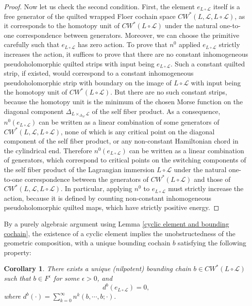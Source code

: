 \documentclass{amsart}
\newtheorem{corollary}[theorem]{Corollary}
\numberwithin{equation}{section}
\numberwithin{figure}{section}
\begin{document}
\begin{proof}
	Now let us check the second condition. First, the element $e_{L \circ \mathcal{L}}$ itself is a free generator of the quilted wrapped Floer cochain space $CW^{*}(L, \mathcal{L}, L \circ \mathcal{L})$, as it corresponds to the homotopy unit of $CW^{*}(L \circ \mathcal{L})$ under the natural one-to-one correspondence between generators. Moreover, we can choose the primitive carefully such that $e_{L \circ \mathcal{L}}$ has zero action. To prove that $n^{0}$ applied $e_{L \circ \mathcal{L}}$ strictly increases the action, it suffices to prove that there are no constant inhomogeneous pseudoholomorphic quilted strips with input being $e_{L \circ \mathcal{L}}$. Such a constant quilted strip, if existed, would correspond to a constant inhomogeneous pseudoholomorphic strip with boundary on the image of $L \circ \mathcal{L}$ with input being the homotopy unit of $CW^{*}(L \circ \mathcal{L})$. But there are no such constant strips, because the homotopy unit is the minimum of the chosen Morse function on the diagonal component $\Delta_{L \times_{\Delta_{M}} \mathcal{L}}$ of the self fiber product. As a consequence, $n^{0}(e_{L \circ \mathcal{L}})$ can be written as a linear combination of some generators of $CW^{*}(L, \mathcal{L}, L \circ \mathcal{L})$, none of which is any critical point on the diagonal component of the self fiber product, or any non-constant Hamiltonian chord in the cylindrical end. Therefore $n^{0}(e_{L \circ \mathcal{L}})$ can be written as a linear combination of generators, which correspond to critical points on the switching components of the self fiber product of the Lagrangian immersion $L \circ \mathcal{L}$ under the natural one-to-one correspondence between the generators of $CW^{*}(L \circ \mathcal{L})$ and those of $CW^{*}(L, \mathcal{L}, L \circ \mathcal{L})$.
In particular, applying $n^{0}$ to $e_{L \circ \mathcal{L}}$ must strictly increase the action, because it is defined by counting non-constant inhomogeneous pseudoholomorphic quilted maps, which have strictly positive energy. \par

\end{proof}

	By a purely algebraic argument using Lemma \ref{cyclic element and bounding cochain}, the existence of a cyclic element implies the unobstructedness of the geometric composition, with a unique bounding cochain $b$ satisfying the following property: \par

\begin{corollary}
	There exists a unique (nilpotent) bounding chain $b \in CW^{*}(L \circ \mathcal{L})$ such that $b \in F^{\epsilon}$ for some $\epsilon > 0$, and
\begin{equation*}
d^{b}(e_{L \circ \mathcal{L}}) = 0,
\end{equation*}
where $d^{b}(\cdot) = \sum_{k=0}^{\infty} n^{k}(b, \cdots, b; \cdot)$.
\end{corollary}
\end{document}
